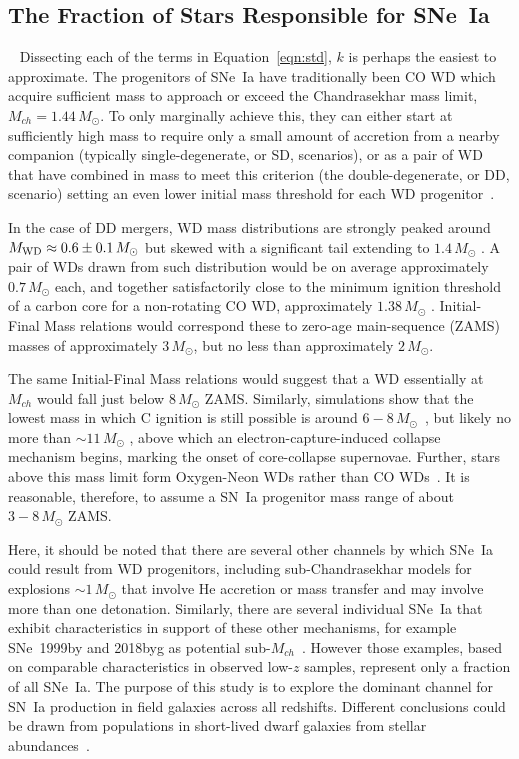 \documentclass[apj, twocolumn]{aastex62}
\begin{document}
\subsection{The Fraction of Stars Responsible for SNe~Ia}~\label{sec:wds}
Dissecting each of the terms in Equation~\ref{eqn:std}, $k$ is perhaps the easiest to approximate. The progenitors of SNe~Ia have traditionally been CO WD which acquire sufficient mass to approach or exceed the Chandrasekhar mass limit, $M_{ch}=1.44\,M_{\odot}$. To only marginally achieve this, they can either start at sufficiently high mass to require only a small amount of accretion from a nearby companion (typically single-degenerate, or SD, scenarios), or as a pair of WD that have combined in mass to meet this criterion (the double-degenerate, or DD, scenario) setting an even lower initial mass threshold for each WD progenitor~\cite[see][ for a review]{Maoz:2014fj}. 

{In the case of DD mergers, WD mass distributions are strongly peaked around $M_{\rm WD}\approx0.6\pm0.1\,M_{\odot}$ but skewed with a significant tail extending to $1.4\, M_{\odot}$ \citep{Catalan:2008il}. A pair of WDs drawn from such distribution would be on average approximately $0.7\, M_{\odot}$ each, and together satisfactorily close to the minimum ignition threshold of a carbon core for a non-rotating CO WD, approximately $1.38\, M_{\odot}$ \citep{Arnett:1969dw, Nomoto:1982vh,Pakmor:2013gf}. Initial-Final Mass relations \cite[e.g.,][]{Catalan:2008il,Cummings:2018oe} would correspond these to zero-age main-sequence (ZAMS) masses of approximately $3\, M_{\odot}$, but no less than approximately $2\, M_{\odot}$. }

The same Initial-Final Mass relations would suggest that a WD essentially at $M_{ch}$ would fall just below $8\, M_{\odot}$ ZAMS. Similarly, simulations show that the lowest mass in which C ignition is still possible is around $6-8 \,M_{\odot}$~\cite{Chen:2014rb,Denissenkov:2015rf}, but likely no more than $\sim11\, M_{\odot}$ \citep{Takahashi:2013jx}, above which an electron-capture-induced collapse mechanism begins, marking the onset of core-collapse supernovae. {Further, stars above this mass limit form Oxygen-Neon WDs rather than CO WDs~\citep{Doherty:2017qy}}. It is reasonable, therefore, to assume a SN~Ia progenitor mass range of about $3-8\,M_{\odot}$ ZAMS. 

{Here, it should be noted that there are several other channels by which SNe~Ia could result from WD progenitors, including sub-Chandrasekhar models for explosions $\sim1\,M_{\odot}$ that involve He accretion or mass transfer and may involve more than one detonation. Similarly, there are several individual SNe~Ia that exhibit characteristics in support of these other mechanisms, for example SNe~1999by and 2018byg as potential sub-$M_{ch}$~\citep{Blondin:2018wn,De:2019rv}. However those examples, based on comparable characteristics in observed low-$z$ samples, represent only a fraction of all SNe~Ia. The purpose of this study is to explore the dominant channel for SN~Ia production in field galaxies across all redshifts. Different conclusions could be drawn from populations in short-lived dwarf galaxies from stellar abundances~\citep{Kirby:2019aa}.}
\end{document}
